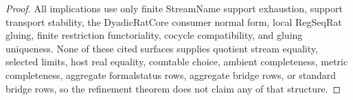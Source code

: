 \begin{proof}
All implications use only finite StreamName support exhaustion, support
transport stability, the DyadicRatCore consumer normal form, local RegSeqRat
gluing, finite restriction functoriality, cocycle compatibility, and gluing
uniqueness. None of these cited surfaces supplies quotient stream equality,
selected limits, host real equality, countable choice, ambient completeness,
metric completeness, aggregate formalstatus rows, aggregate bridge rows, or
standard bridge rows, so the refinement theorem does not claim any of that
structure.
\end{proof}
